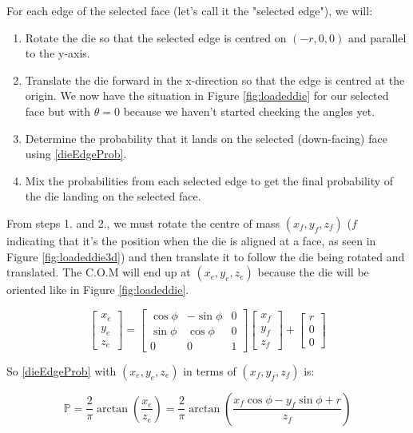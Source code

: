 \documentclass[english,12pt,a4paper,final]{article}
\begin{document}
For each edge of the selected face (let's call it the "selected edge"), we will:

\begin{enumerate}
	\item Rotate the die so that the selected edge is centred on $(-r, 0, 0)$ and parallel to the y-axis.
	\item Translate the die forward in the x-direction so that the edge is centred at the origin. We now have the situation in Figure \ref{fig:loadeddie} for our selected face but with $\theta=0$ because we haven't started checking the angles yet.
	\item Determine the probability that it lands on the selected (down-facing) face using \eqref{dieEdgeProb}.
	\item Mix the probabilities from each selected edge to get the final probability of the die landing on the selected face.
\end{enumerate}

From steps 1. and 2., we must rotate the centre of mass $(x_f, y_f, z_f)$ ($f$ indicating that it's the position when the die is aligned at a face, as seen in Figure \ref{fig:loadeddie3d}) and then translate it to follow the die being rotated and translated. The C.O.M will end up at $(x_e, y_e, z_e)$ because the die will be oriented like in Figure \ref{fig:loadeddie}.

\begin{equation*}
	\begin{bmatrix}x_e\\y_e\\z_e\end{bmatrix} = \begin{bmatrix}\cos\phi & -\sin\phi & 0 \\ \sin\phi & \cos\phi & 0 \\ 0 & 0 & 1\end{bmatrix} \begin{bmatrix}x_f\\y_f\\z_f\end{bmatrix} + \begin{bmatrix}r\\0\\0\end{bmatrix}
\end{equation*}

So \eqref{dieEdgeProb} with $(x_e, y_e, z_e)$ in terms of $(x_f, y_f, z_f)$ is:

\begin{equation*}
	\mathbb{P} = \frac{2}{\pi}\arctan\left(\frac{x_e}{z_e}\right) = \frac{2}{\pi}\arctan\left(\frac{x_f\cos\phi-y_f\sin\phi+r}{z_f}\right)
\end{equation*}
\end{document}
